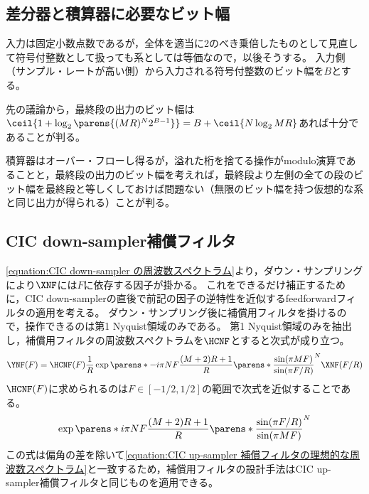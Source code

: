     \subsection{差分器と積算器に必要なビット幅}
        入力は固定小数点数であるが，全体を適当に2のべき乗倍したものとして見直して符号付整数として扱っても系としては等価なので，以後そうする。
        入力側（サンプル・レートが高い側）から入力される符号付整数のビット幅を$B$とする。
        \par
        先の議論から，最終段の出力のビット幅は$\ceil{1 + \log_2\parens{(MR)^N 2^{B-1}}} = B + \ceil{N\log_2 MR}$あれば十分であることが判る。
        \par
        積算器はオーバー・フローし得るが，溢れた桁を捨てる操作がmodulo演算であることと，最終段の出力のビット幅を考えれば，最終段より左側の全ての段のビット幅を最終段と等しくしておけば問題ない（無限のビット幅を持つ仮想的な系と同じ出力が得られる）ことが判る。
    \subsection{CIC down-sampler補償フィルタ}
        \cref{equation:CIC down-sampler の周波数スペクトラム}より，ダウン・サンプリングにより$\XNF$には$F$に依存する因子が掛かる。
        これをできるだけ補正するために，CIC down-samplerの直後で前記の因子の逆特性を近似するfeedforwardフィルタの適用を考える。
        ダウン・サンプリング後に補償用フィルタを掛けるので，操作できるのは第1 Nyquist領域のみである。
        第1 Nyquist領域のみを抽出し，補償用フィルタの周波数スペクトラムを$\HCNF$とすると次式が成り立つ。
        \[ \YNF(F) = \HCNF(F) \frac{1}{R} \exp\parens*{-i\pi N F\frac{(M+2)R+1}{R}}\parens*{\frac{\sin(\pi MF)}{\sin(\pi F/R)}}^N \XNF(F/R) \]
        $\HCNF(F)$に求められるのは$F \in [-1/2,1/2]$の範囲で次式を近似することである。
        \begin{equation}
            \exp\parens*{i\pi N F\frac{(M+2)R+1}{R}}\parens*{\frac{\sin(\pi F/R)}{\sin(\pi MF)}}^N
        \end{equation}
        この式は偏角の差を除いて\cref{equation:CIC up-sampler 補償フィルタの理想的な周波数スペクトラム}と一致するため，補償用フィルタの設計手法はCIC up-sampler補償フィルタと同じものを適用できる。

